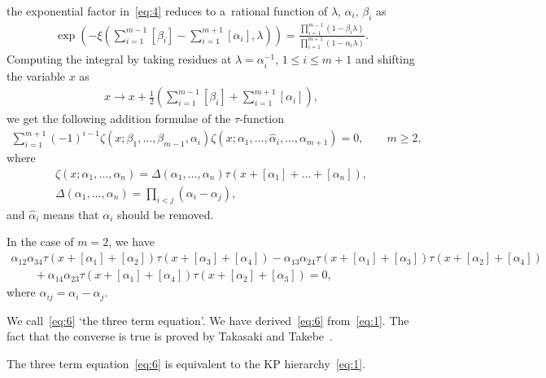 \documentclass[pdftex]{sigma}
\begin{document}
the exponential factor in~\eqref{eq:4} reduces to a~rational function of $\lambda$, $\alpha_i$, $\beta_i$ as
\begin{gather*}
\exp\left(-\xi\left(\sum_{i=1}^{m-1}[\beta_i]-\sum_{i=1}^{m+1}[\alpha_i],\lambda\right)\right)
=\frac{\prod\limits_{i=1}^{m-1}(1-\beta_i\lambda)}{\prod\limits_{i=1}^{m+1}
(1-\alpha_i\lambda)}.
\end{gather*}
Computing the integral by taking residues at $\lambda=\alpha_i^{-1}$, $1\le i\le m+1$ \cite{M1} and
shifting the variable $x$ as
\begin{gather*}
x\rightarrow x+\frac{1}{2}\left(\sum_{i=1}^{m-1}[\beta_i]+\sum_{i=1}^{m+1}[\alpha_i]\right),
\end{gather*}
we get the following addition formulae of the $\tau$-function~\cite{SS1}
\begin{gather}
\sum_{i=1}^{m+1}(-1)^{i-1}\zeta(x;\beta_1,\dots,\beta_{m-1},\alpha_i)\zeta(x;\alpha_1,\dots,\hat{\alpha}
_i,\dots,\alpha_{m+1})=0,\qquad  m\ge2,
\label{eq:5}
\end{gather}
where
\begin{gather*}
\zeta(x;\alpha_1,\dots,\alpha_{n})=\Delta(\alpha_1,\dots,\alpha_{n})\tau(x+[\alpha_1]+\dots+[\alpha_{n}]),
\\
\Delta(\alpha_1,\dots,\alpha_n)=\prod_{i<j}(\alpha_i-\alpha_j),
\end{gather*}
and $\hat{\alpha}_i$ means that $\alpha_i$ should be removed.
\begin{example}\label{example1}
In the case of $m=2$, we have
\begin{gather}
\alpha_{12}\alpha_{34}\tau(x+[\alpha_1]+[\alpha_2])\tau(x+[\alpha_3]+[\alpha_4])
-\alpha_{13}\alpha_{24}\tau(x+[\alpha_1]+[\alpha_3])\tau(x+[\alpha_2]+[\alpha_4])
\nonumber
\\
\qquad
{}+\alpha_{14}\alpha_{23}\tau(x+[\alpha_1]+[\alpha_4])\tau(x+[\alpha_2]+[\alpha_3])=0,
\label{eq:6}
\end{gather}
where $\alpha_{ij}=\alpha_i-\alpha_j$.
\end{example}

We call~\eqref{eq:6} `the three term equation'.
We have derived~\eqref{eq:6} from~\eqref{eq:1}.
The fact that the converse is true is proved by Takasaki and Takebe~\cite{TT1}.
\begin{theorem}[\cite{TT1}] \label{theorem1} The three term equation~\eqref{eq:6} is equivalent to the KP hierarchy~\eqref{eq:1}.
\end{theorem}
\end{document}
